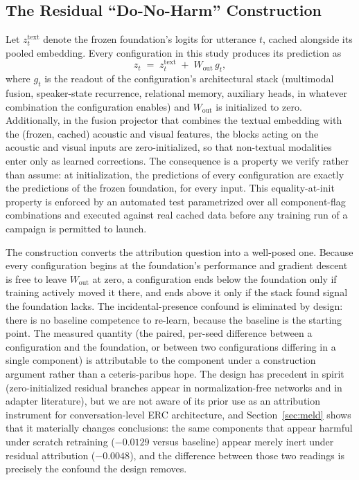 \subsection{The Residual ``Do-No-Harm'' Construction}
\label{sec:residual-construction}

Let $z^{\text{text}}_t$ denote the frozen foundation's logits for utterance $t$, cached alongside its pooled embedding. Every configuration in this study produces its prediction as
\begin{equation}
z_t \;=\; z^{\text{text}}_t \;+\; W_{\text{out}}\, g_t,
\label{eq:residual}
\end{equation}
where $g_t$ is the readout of the configuration's architectural stack (multimodal fusion, speaker-state recurrence, relational memory, auxiliary heads, in whatever combination the configuration enables) and $W_{\text{out}}$ is initialized to zero. Additionally, in the fusion projector that combines the textual embedding with the (frozen, cached) acoustic and visual features, the blocks acting on the acoustic and visual inputs are zero-initialized, so that non-textual modalities enter only as learned corrections. The consequence is a property we verify rather than assume: at initialization, the predictions of every configuration are exactly the predictions of the frozen foundation, for every input. This equality-at-init property is enforced by an automated test parametrized over all component-flag combinations and executed against real cached data before any training run of a campaign is permitted to launch.

The construction converts the attribution question into a well-posed one. Because every configuration begins at the foundation's performance and gradient descent is free to leave $W_{\text{out}}$ at zero, a configuration ends below the foundation only if training actively moved it there, and ends above it only if the stack found signal the foundation lacks. The incidental-presence confound is eliminated by design: there is no baseline competence to re-learn, because the baseline is the starting point. The measured quantity (the paired, per-seed difference between a configuration and the foundation, or between two configurations differing in a single component) is attributable to the component under a construction argument rather than a ceteris-paribus hope. The design has precedent in spirit (zero-initialized residual branches appear in normalization-free networks and in adapter literature), but we are not aware of its prior use as an attribution instrument for conversation-level ERC architecture, and Section~\ref{sec:meld} shows that it materially changes conclusions: the same components that appear harmful under scratch retraining ($-0.0129$ versus baseline) appear merely inert under residual attribution ($-0.0048$), and the difference between those two readings is precisely the confound the design removes.

